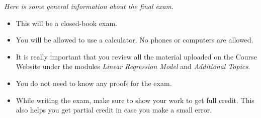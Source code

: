 \documentclass{./../../Latex/handout}
\begin{document}
\thispagestyle{plain}

\textit{Here is some general information about the final exam.}
\begin{itemize}
\item This will be a closed-book exam.
\item You will be allowed to use a calculator. No phones or computers are allowed. 
\item It is really important that you review all the material uploaded on the Course Website under the modules \textit{Linear Regression Model} and \textit{Additional Topics}.
\item You do not need to know any proofs for the exam.

\item While writing the exam, make sure to show your work to get full credit. This also helps you get partial credit in case you make a small error.
\end{itemize}
\end{document}

